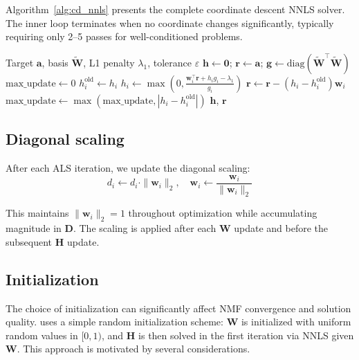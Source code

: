\documentclass[article]{jss_modified}
\begin{document}
Algorithm~\ref{alg:cd_nnls} presents the complete coordinate descent NNLS 
solver. The inner loop terminates when no coordinate changes significantly, 
typically requiring only 2--5 passes for well-conditioned problems.

\begin{algorithm}[t]
\caption{Coordinate descent NNLS with L1 regularization}
\label{alg:cd_nnls}
\begin{algorithmic}[1]
\Require Target $\mathbf{a}$, basis $\tilde{\mathbf{W}}$, L1 penalty $\lambda_1$, 
tolerance $\varepsilon$
\State $\mathbf{h} \leftarrow \mathbf{0}$; $\mathbf{r} \leftarrow \mathbf{a}$; 
$\mathbf{g} \leftarrow \text{diag}(\tilde{\mathbf{W}}^\top\tilde{\mathbf{W}})$
\Repeat
  \State $\text{max\_update} \leftarrow 0$
    \State $h_i^{\text{old}} \leftarrow h_i$
    \State $h_i \leftarrow \max\left(0, \frac{\mathbf{w}_i^\top\mathbf{r} + 
    h_i g_i - \lambda_1}{g_i}\right)$
      \State $\mathbf{r} \leftarrow \mathbf{r} - (h_i - h_i^{\text{old}})
      \mathbf{w}_i$
      \State $\text{max\_update} \leftarrow \max(\text{max\_update}, 
      |h_i - h_i^{\text{old}}|)$
    \EndIf
  \EndFor
{}
\State \Return $\mathbf{h}$, $\mathbf{r}$
\end{algorithmic}
\end{algorithm}

\subsection{Diagonal scaling}

After each ALS iteration, we update the diagonal scaling:
\begin{equation}
  d_i \leftarrow d_i \cdot \|\mathbf{w}_i\|_2, \quad 
  \mathbf{w}_i \leftarrow \frac{\mathbf{w}_i}{\|\mathbf{w}_i\|_2}
  \label{eq:scaling}
\end{equation}

This maintains $\|\mathbf{w}_i\|_2 = 1$ throughout optimization while 
accumulating magnitude in $\mathbf{D}$. The scaling is applied after each 
$\mathbf{W}$ update and before the subsequent $\mathbf{H}$ update.

\subsection{Initialization}

The choice of initialization can significantly affect NMF convergence and 
solution quality.  uses a simple random initialization scheme: 
$\mathbf{W}$ is initialized with uniform random values in $[0, 1)$, and 
$\mathbf{H}$ is then solved in the first iteration via NNLS given 
$\mathbf{W}$. This approach is motivated by several considerations.
\end{document}
